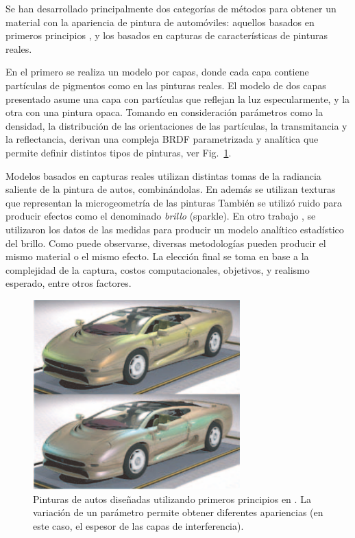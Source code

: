 Se han desarrollado principalmente dos categorías de métodos para obtener un material con la apariencia de pintura de automóviles: aquellos basados en primeros principios \cite{Ershov2001}, y los basados en capturas de características de pinturas reales.

En el primero se realiza un modelo por capas, donde cada capa contiene partículas de pigmentos como en las pinturas reales.
El modelo de dos capas presentado asume una capa con partículas que reflejan la luz especularmente, y la otra con una pintura opaca.
Tomando en consideración parámetros como la densidad, la distribución de las orientaciones de las partículas, la transmitancia y la reflectancia, derivan una compleja BRDF parametrizada y analítica que permite definir distintos tipos de pinturas, ver Fig.~\ref{fg:pinturaauto}.

Modelos basados en capturas reales utilizan distintas tomas de la radiancia saliente de la pintura de autos, combinándolas.
En \cite{Dumont2001} además se utilizan texturas que representan la microgeometría de las pinturas También se utilizó ruido para producir efectos como el denominado {\em brillo} (sparkle).
En otro trabajo \cite{Gunther2005}, se utilizaron los datos de las medidas para producir un modelo analítico estadístico del brillo.
Como puede observarse, diversas metodologías pueden producir el mismo material o el mismo efecto.
La elección final se toma en base a la complejidad de la captura, costos computacionales, objetivos, y realismo esperado, entre otros factores.

\begin{figure}
\center
\includegraphics[width=8cm]{figures/pinturaauto}
\caption[Pinturas de autos diseñadas utilizando primeros principios]{Pinturas de autos diseñadas utilizando primeros principios en \cite{Ershov2001}. La variación de un parámetro permite obtener diferentes apariencias (en este caso, el espesor de las capas de interferencia).}
\label{fg:pinturaauto}
\end{figure}


